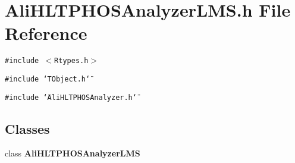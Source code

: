 \section{Ali\-HLTPHOSAnalyzer\-LMS.h File Reference}
\label{AliHLTPHOSAnalyzerLMS_8h}
{\tt \#include $<$Rtypes.h$>$}\par
{\tt \#include \char`\"{}TObject.h\char`\"{}}\par
{\tt \#include \char`\"{}Ali\-HLTPHOSAnalyzer.h\char`\"{}}\par
\subsection*{Classes}
\begin{CompactItemize}
\item 
class {\bf Ali\-HLTPHOSAnalyzer\-LMS}
\end{CompactItemize}

